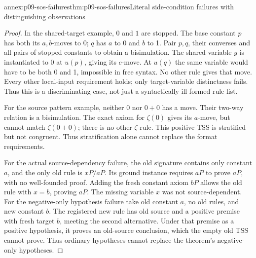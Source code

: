 \begin{annexitem}{annex:p09-sos-failures}{thm:p09-sos-failures}{Literal side-condition failures with distinguishing observations}
\begin{proof}
In the shared-target example, \(0\) and \(1\) are stopped.
The base constant \(p\) has both its \(a,b\)-moves to 0;
\(q\) has \(a\) to 0 and \(b\) to 1. Pair \(p,q\), their
converses and all pairs of stopped constants to obtain a bisimulation.
The shared variable \(y\) is instantiated to 0 at \(u(p)\),
giving its \(c\)-move. At \(u(q)\) the same variable would
have to be both 0 and 1, impossible in free syntax. No other rule
gives that move. Every other local-input requirement holds; only
target-variable distinctness fails. Thus this is a discriminating
case, not just a syntactically ill-formed rule list.

For the source pattern example, neither 0 nor \(0+0\) has a
move. Their two-way relation is a bisimulation. The exact axiom
for \(\zeta(0)\) gives its \(a\)-move, but cannot match
\(\zeta(0+0)\); there is no other \(\zeta\)-rule. This
positive TSS is stratified but not congruent. Thus stratification
alone cannot replace the format requirements.

For the actual source-dependency failure, the old signature contains
only constant \(a\), and the only old rule is \(xP/aP\).
Its ground instance requires \(aP\) to prove \(aP\), with
no well-founded proof. Adding the fresh constant axiom \(bP\)
allows the old rule with \(x=b\), proving \(aP\). The missing
variable \(x\) was not source-dependent. For the negative-only
hypothesis failure take old constant \(a\), no old rules, and
new constant \(b\). The registered new rule has old source
and a positive premise with fresh target \(b\), meeting the
second alternative. Under that premise as a positive hypothesis,
it proves an old-source conclusion, which the empty old TSS
cannot prove. Thus ordinary hypotheses cannot replace the theorem's
negative-only hypotheses.
\end{proof}
\end{annexitem}

